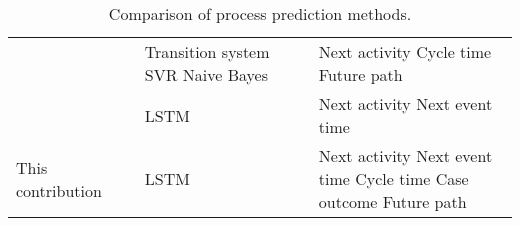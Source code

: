 \begin{table}[]
\begin{tabularx}{\textwidth}{
			>{\hsize=2.0\hsize}X
			>{\hsize=0.4\hsize}X
			>{\hsize=1.3\hsize}X
			>{\hsize=0.5\hsize}X
			>{\hsize=0.5\hsize}X
			>{\hsize=1.3\hsize}X
		}
		 \citeauthor{DBLP:journals/computing/PolatoSBL18} \cite{DBLP:journals/computing/PolatoSBL18}&  \citeyear{DBLP:journals/computing/PolatoSBL18} &  Transition system \newline SVR \newline Naive Bayes &  \checkmark & \xmark & Next activity \newline Cycle time \newline Future path \\
		 
		 \citeauthor{DBLP:conf/icpm/ParkS19} \cite{DBLP:conf/icpm/ParkS19} & \citeyear{DBLP:conf/icpm/ParkS19} & LSTM & \checkmark & \xmark &Next activity \newline Next event time  \\
		 
		 This contribution &  2020 &  LSTM & \checkmark & \checkmark &  Next activity \newline Next event time  \newline Cycle time \newline Case outcome \newline Future path
	 	\\ \bottomrule
	\end{tabularx}
	\caption[Comparison  of process prediction methods]{Comparison  of process prediction methods.}
	\label{tab:preliminaries}
\end{table}